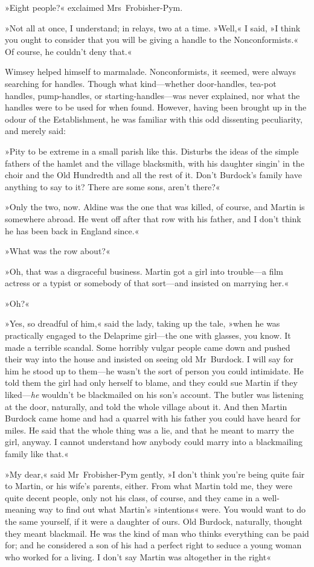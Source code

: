 »Eight people?« exclaimed Mrs~Frobisher-Pym.

»Not all at once, I understand; in relays, two at a time. »Well,« I said, »I think you ought to consider that you will be giving a handle to the Nonconformists.« Of course, he couldn't deny that.«

Wimsey helped himself to marmalade. Nonconformists, it seemed, were always searching for handles. Though what kind—whether door-handles, tea-pot handles, pump-handles, or starting-handles—was never explained, nor what the handles were to be used for when found. However, having been brought up in the odour of the Establishment, he was familiar with this odd dissenting peculiarity, and merely said:

»Pity to be extreme in a small parish like this. Disturbs the ideas of the simple fathers of the hamlet and the village blacksmith, with his daughter singin' in the choir and the Old Hundredth and all the rest of it. Don't Burdock's family have anything to say to it? There are some sons, aren't there?«

»Only the two, now. Aldine was the one that was killed, of course, and Martin is somewhere abroad. He went off after that row with his father, and I don't think he has been back in England since.«

»What was the row about?«

»Oh, that was a disgraceful business. Martin got a girl into trouble—a film actress or a typist or somebody of that sort—and insisted on marrying her.«

»Oh?«

»Yes, so dreadful of him,« said the lady, taking up the tale, »when he was practically engaged to the Delaprime girl—the one with glasses, you know. It made a terrible scandal. Some horribly vulgar people came down and pushed their way into the house and insisted on seeing old Mr~Burdock. I will say for him he stood up to them—he wasn't the sort of person you could intimidate. He told them the girl had only herself to blame, and they could sue Martin if they liked—\textit{he} wouldn't be blackmailed on his son's account. The butler was listening at the door, naturally, and told the whole village about it. And then Martin Burdock came home and had a quarrel with his father you could have heard for miles. He said that the whole thing was a lie, and that he meant to marry the girl, anyway. I cannot understand how anybody could marry into a blackmailing family like that.«

»My dear,« said Mr~Frobisher-Pym gently, »I don't think you're being quite fair to Martin, or his wife's parents, either. From what Martin told me, they were quite decent people, only not his class, of course, and they came in a well-meaning way to find out what Martin's »intentions« were. You would want to do the same yourself, if it were a daughter of ours. Old Burdock, naturally, thought they meant blackmail. He was the kind of man who thinks everything can be paid for; and he considered a son of his had a perfect right to seduce a young woman who worked for a living. I don't say Martin was altogether in the right\longdash«

